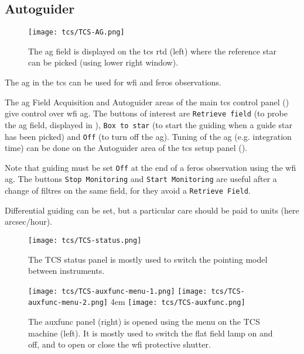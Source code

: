 \documentclass[11pt,fleqn,a4paper]{book}
\begin{document}
\subsection{Autoguider}
\label{autoguider}

\begin{figure}[!ht]
\centering
\texttt{[image: tcs/TCS-AG.png]}
\caption[WFI autoguider]{The \gls{ag} field is displayed on the \gls{tcs} \gls{rtd} (left) where the
 reference star can be picked (using lower right window).} 
\label{fig:tcsag}
\end{figure}
The \gls{ag} in the \gls{tcs} can be used for \gls{wfi} and \gls{feros} observations.

The \gls{ag} Field Acquisition and Autoguider areas of the main \gls{tcs}
control panel () give control over \gls{wfi} \gls{ag}.  The buttons
of interest are \texttt{Retrieve field} (to probe the \gls{ag} field, displayed
in ), \texttt{Box to star} (to start the guiding when a guide
star has been picked) and \texttt{Off} (to turn off the \gls{ag}).  Tuning of
the \gls{ag} (e.g. integration time) can be done on  the Autoguider area of the
\gls{tcs} setup panel ().

Note that guiding must be set \texttt{Off} at the end of a \gls{feros}
observation using the \gls{wfi} \gls{ag}. The buttons \texttt{Stop Monitoring}
and \texttt{Start Monitoring} are useful after a change of filtres on the same
field, for they avoid a \texttt{Retrieve Field}.

Differential guiding can be set, but a particular care should be paid
to units (here arcsec/hour).


\begin{figure}[!ht]
\centering
\texttt{[image: tcs/TCS-status.png]}
\caption[Status window of the telescope control software]{The \gls{TCS status panel} is mostly used to switch the \gls{pointing model}
between instruments.}
\label{fig:tcsstatus}
\end{figure}


\begin{figure}[!ht]
\centering
\texttt{[image: tcs/TCS-auxfunc-menu-1.png]}%
\texttt{[image: tcs/TCS-auxfunc-menu-2.png]}
\hglue 4em
\texttt{[image: tcs/TCS-auxfunc.png]}
\caption[Auxiliary functions of the telescope control software]{The \gls{auxfunc} panel (right) is opened using the menu
on the TCS machine (left). It is mostly used to switch the flat field 
lamp on and off, and to open or close the \gls{wfi} \gls{protective shutter}.}
\label{fig:tcsauxfunc}
\end{figure}
\end{document}
